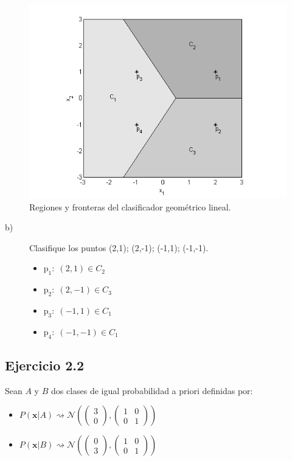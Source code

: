 \documentclass[11pt,a4paper,final]{article}
\begin{document}
\begin{figure}[hb]
	\centering
	\includegraphics[width=.65\textwidth]{ejercicio21}
	\caption{Regiones y fronteras del clasificador geométrico lineal.}
	\label{ejercicio21}
\end{figure}

\begin{description}
\item[b)] Clasifique los puntos (2,1); (2,-1); (-1,1); (-1,-1).
\begin{itemize}
\item $\mathrm{p_1}:\; (2,1) \in C_2$
\item $\mathrm{p_2}:\; (2,-1) \in C_3$
\item $\mathrm{p_3}:\; (-1,1) \in C_1$
\item $\mathrm{p_4}:\; (-1,-1) \in C_1$
\end{itemize}
\end{description}



\subsection{Ejercicio 2.2}

Sean $A$ y $B$ dos clases de igual probabilidad a priori definidas por:
\begin{itemize}
\item $P(\mathbf{x}|A) \rightsquigarrow \mathcal{N}\left( 
\left(\begin{matrix}3\\0 \end{matrix}\right) ,
\left(\begin{matrix}1 & 0\\0 & 1 \end{matrix} \right) 
\right)$ 
\item $P(\mathbf{x}|B) \rightsquigarrow \mathcal{N}\left( 
\left(\begin{matrix}0\\3 \end{matrix}\right) ,
\left(\begin{matrix}1 & 0\\0 & 1 \end{matrix} \right) 
\right)$ 
\end{itemize}
\end{document}
